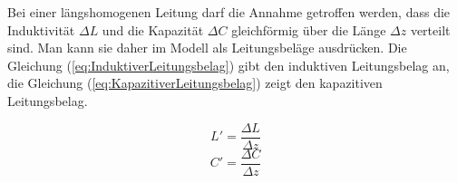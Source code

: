 Bei einer längshomogenen Leitung darf die Annahme getroffen werden, dass die Induktivität $\Delta L$ und die Kapazität $\Delta C$ gleichförmig über die Länge $\Delta z$ verteilt sind. Man kann sie daher im Modell als Leitungsbeläge ausdrücken. Die Gleichung (\ref{eq:InduktiverLeitungsbelag}) gibt den induktiven Leitungsbelag an, die Gleichung (\ref{eq:KapazitiverLeitungsbelag}) zeigt den kapazitiven Leitungsbelag.

\begin{equation}
L'=\dfrac{\Delta L}{\Delta z}\label{eq:InduktiverLeitungsbelag}
\end{equation}
\begin{equation}
C'=\dfrac{\Delta C}{\Delta z}\label{eq:KapazitiverLeitungsbelag}
\end{equation}






